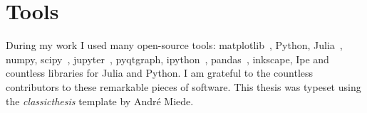 \endgroup


\newpage
\section*{Tools}
During my work I used many open-source tools: matplotlib~\cite{Hunter2007}, Python, Julia~\cite{julia}, numpy, scipy~\cite{scipy}, jupyter~\cite{jupyter}, pyqtgraph, ipython~\cite{ipython}, pandas~\cite{pandas}, inkscape, Ipe and countless libraries for Julia and Python.
I am grateful to the countless contributors to these remarkable pieces of software. This thesis was typeset using the \emph{classicthesis} template by André Miede.
